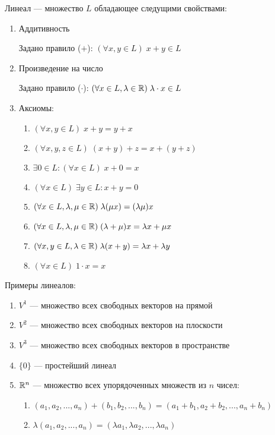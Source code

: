 \documentclass{article}
\begin{document}


Линеал --- множество $L$ обладающее следущими свойствами:
\begin{enumerate}
	\item{}Аддитивность

	Задано правило ($+$): $(\forall x,y\in L)\;x+y\in L$

	\item{}Произведение на число

	Задано правило ($\cdot$): $(\forall x\in L,\lambda\in\mathbb{R})\;\lambda\cdot x\in L$

	\item{}Аксиомы:
	\begin{enumerate}[label=\Roman*.]
		\item{}$(\forall x,y\in L)\;x+y=y+x$
		\item{}$(\forall x,y,z\in L)\;(x+y)+z=x+(y+z)$
		\item{}$\exists 0\in L:(\forall x\in L)\;x+0=x$
		\item{}$(\forall x\in L)\;\exists y\in L:x+y=0$
		\item{}$(\forall x\in L,\lambda, \mu\in\mathbb{R})\;\lambda(\mu x)=(\lambda\mu)x$
		\item{}$(\forall x\in L,\lambda,\mu\in\mathbb{R})\;(\lambda+\mu)x=\lambda x+\mu x$
		\item{}$(\forall x,y\in L,\lambda\in\mathbb{R})\;\lambda(x+y)=\lambda x+\lambda y$
		\item{}$(\forall x\in L)\;1\cdot x=x$
	\end{enumerate}
\end{enumerate}

Примеры линеалов:
\begin{enumerate}
	\item{}$V^{1}$ --- множество всех свободных векторов на прямой
	\item{}$V^{2}$ --- множество всех свободных векторов на плоскости
	\item{}$V^{3}$ --- множество всех свободных векторов в пространстве
	\item{}$\{0\}$ --- простейший линеал
	\item{}$\mathbb{R}^{n}$ --- множество всех упорядоченных множеств из $n$ чисел:
	\begin{enumerate}
		\item{}$(a_1,a_2,...,a_n)+(b_1,b_2,...,b_n)=(a_1+b_1,a_2+b_2,...,a_n+b_n)$
		\item{}$\lambda(a_1,a_2,...,a_n)=(\lambda a_1,\lambda a_2,...,\lambda a_n)$
	\end{enumerate}
\end{enumerate}
\end{document}
